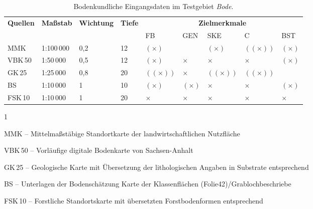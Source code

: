 \begin{table}[t]
  \centering
  \caption[Bodenkundliche Eingangsdaten im Testgebiet \textit{Bode}.]{Bodenkundliche Eingangsdaten im Testgebiet \textit{Bode}.}\label{tab:daten}
	\vspace*{6pt}
  \begin{threeparttable}
    \begin{tabularx}{\textwidth}{l|m{1.4cm}|m{1.55cm}|X|X|X|X|X|X}
    \toprule
    \multirow{2}[0]{*}{\textbf{Quellen}\tnote{1}} & \multirow{2}[0]{*}{\textbf{Maßstab}} & \multirow{2}[0]{*}{\textbf{Wichtung}} &\multirow{2}[0]{*}{\textbf{Tiefe}\tnote{2}} & \multicolumn{5}{c}{\textbf{Zielmerkmale}\tnote{3}}\\
				  &			      & 		  &		         & FB 	        & GEN	     & SKE	    & C	  & BST \\\midrule
    MMK			& 1:100\,000& 0,2   & 12         & $(\times)$   &		       &$(\times)$  & $((\times))$ &$(\times)$\\\midrule
    VBK\,50			& 1:50\,000	& 0,5   & 12         & $(\times)$   &$\times$  &$\times$  & $\times$ &  $(\times)$\\\midrule
    GK\,25			& 1:25\,000	& 0,8   & 20& $((\times))$ &$\times$  &$((\times))$  & $((\times))$   &  \\\midrule
    BS				& 1:10\,000	& 1     & 10         & $(\times)$   &$(\times)$&$\times$& $\times$   &  $(\times)$\\\midrule
    FSK\,10			& 1:10\,000	& 1     & 20         & $\times$     &$\times$  &$\times$  & $\times$   &  $\times$\\\bottomrule
    \end{tabularx}%
    \begin{tablenotes}
		\item[1] \begin{asparaitem}
		\item MMK -- Mittelmaßstäbige Standortkarte der landwirtschaftlichen Nutzfläche
		\item VBK\,50 -- Vorläufige digitale Bodenkarte von Sachsen-Anhalt
		\item GK\,25 -- Geologische Karte mit Übersetzung der lithologischen Angaben in Substrate entsprechend \citet{KA5}		\item BS -- Unterlagen der Bodenschätzung Karte der Klassenflächen (Folie42)/Grablochbeschriebe
		\item FSK\,10 -- Forstliche Standortskarte mit übersetzten Forstbodenformen entsprechend \citet{KA5}
		\end{asparaitem}

\end{tablenotes}
\end{threeparttable}
\end{table}
